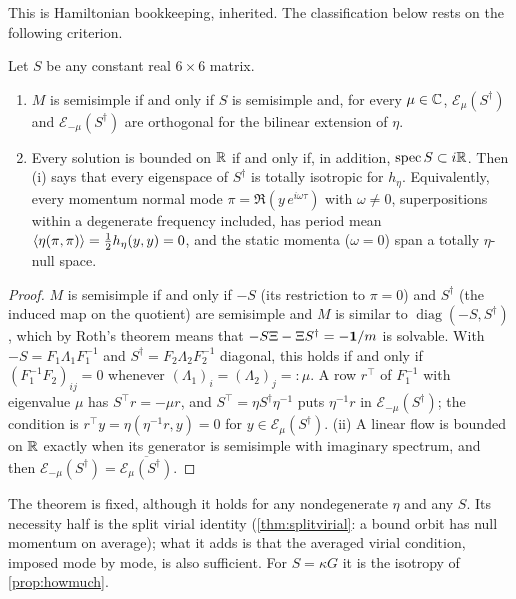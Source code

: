 This is Hamiltonian bookkeeping, inherited. The classification below rests on the following criterion.

\begin{theorem}
\label{bf:criterion}
Let $S$ be any constant real $6\times6$ matrix.
\begin{enumerate}[label=(\roman*),leftmargin=2.2em]
\item $M$ is semisimple if and only if $S$ is semisimple and, for every $\mu\in\mathbb{C}$, $\mathcal E_\mu(S^\dagger)$ and $\mathcal E_{-\mu}(S^\dagger)$ are
orthogonal for the bilinear extension of $\eta$.
\item Every solution is bounded on $\mathbb{R}$ if and only if, in addition, $\operatorname{spec} S\subset i\mathbb{R}$. Then (i) says that every eigenspace of $S^\dagger$ is
totally isotropic for $h_\eta$. Equivalently, every momentum normal mode $\pi=\Re(y\,e^{i\omega\tau})$ with $\omega\neq0$, superpositions within a
degenerate frequency included, has period mean $\langle\eta(\pi,\pi)\rangle=\tfrac12 h_\eta(y,y)=0$, and the static momenta ($\omega=0$) span a totally
$\eta$-null space.
\end{enumerate}
\end{theorem}

\begin{proof}
$M$ is semisimple if and only if $-S$ (its restriction to $\pi=0$) and $S^\dagger$ (the induced map on the quotient) are semisimple and $M$ is
similar to $\operatorname{diag}(-S,S^\dagger)$, which by Roth's theorem \cite{Roth52} means that $-S\Xi-\Xi S^\dagger=-\mathbf 1/m$ is solvable. With
$-S=F_1\Lambda_1F_1^{-1}$ and $S^\dagger=F_2\Lambda_2F_2^{-1}$ diagonal, this holds if and only if $(F_1^{-1}F_2)_{ij}=0$ whenever
$(\Lambda_1)_i=(\Lambda_2)_j=:\mu$. A row $r^{\!\top}$ of $F_1^{-1}$ with eigenvalue $\mu$ has $S^{\!\top}r=-\mu r$, and $S^{\!\top}=\eta S^\dagger\eta^{-1}$
puts $\eta^{-1}r$ in $\mathcal E_{-\mu}(S^\dagger)$; the condition is $r^{\!\top}y=\eta(\eta^{-1}r,y)=0$ for $y\in\mathcal E_\mu(S^\dagger)$. (ii) A linear
flow is bounded on $\mathbb{R}$ exactly when its generator is semisimple with imaginary spectrum, and then $\mathcal E_{-\mu}(S^\dagger)=\overline{\mathcal E_\mu(S^\dagger)}$.
\end{proof}

The theorem is fixed, although it holds for any nondegenerate $\eta$ and any $S$. Its necessity half is the split virial identity
(\cref{thm:splitvirial}: a bound orbit has null momentum on average); what it adds is that the averaged virial condition, imposed mode by mode, is
also sufficient. For $S=\kappa G$ it is the isotropy of \cref{prop:howmuch}.

